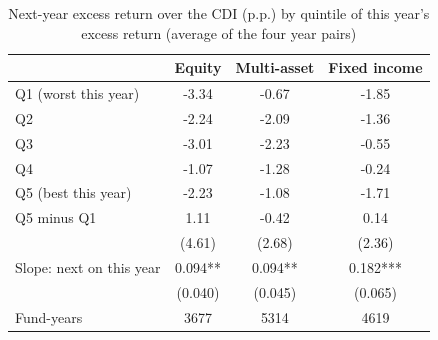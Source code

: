 \begin{table}[htbp]\centering
\caption{Next-year excess return over the CDI (p.p.) by quintile of this year's excess return (average of the four year pairs)}
\begin{tabular}{lccc}
\toprule
& Equity & Multi-asset & Fixed income \\
\midrule
Q1 (worst this year) & -3.34 & -0.67 & -1.85 \\
Q2 & -2.24 & -2.09 & -1.36 \\
Q3 & -3.01 & -2.23 & -0.55 \\
Q4 & -1.07 & -1.28 & -0.24 \\
Q5 (best this year) & -2.23 & -1.08 & -1.71 \\
\midrule
Q5 minus Q1 & 1.11 & -0.42 & 0.14 \\
 & (4.61) & (2.68) & (2.36) \\
Slope: next on this year & 0.094** & 0.094** & 0.182*** \\
 & (0.040) & (0.045) & (0.065) \\
Fund-years & 3677 & 5314 & 4619 \\
\bottomrule
\end{tabular}
\end{table}
